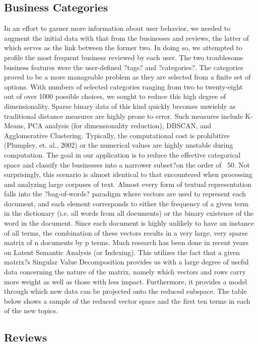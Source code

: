 \subsection{Business Categories}
    \quad In an effort to garner more information about user behavior, we needed to augment the initial data with that from the businesses and reviews, the latter of which serves as the link between the former two. In doing so, we attempted to profile the most frequent business reviewed by each user. The two troublesome business features were the user-defined ?tags? and ?categories?. The categories proved to be a more manageable problem as they are selected from a finite set of options. With numbers of selected categories ranging from two to twenty-eight out of over 1000 possible choices, we sought to reduce this high degree of dimensionality.
    \quad Sparse binary data of this kind quickly becomes unwieldy as traditional distance measures are highly prone to error. Such measures include K-Means, PCA analysis (for dimensionality reduction), DBSCAN, and Agglomerative Clustering. Typically, the computational cost is prohibitive (Plumpley, et. al., 2002) or the numerical values are highly unstable during computation. The goal in our application is to reduce the effective categorical space and classify the businesses into a narrower subset?on the order of ~50. Not surprisingly, this scenario is almost identical to that encountered when processing and analyzing large corpuses of text. Almost every form of textual representation falls into the ?bag-of-words? paradigm where vectors are used to represent each document, and each element corresponds to either the frequency of a given term in the dictionary (i.e. all words from all documents) or the binary existence of the word in the document. Since each document is highly unlikely to have an instance of all terms, the combination of these vectors results in a very large, very sparse matrix of n documents by p terms.
    \quad Much research has been done in recent years on Latent Semantic Analysis (or Indexing). This utilizes the fact that a given matrix?s Singular Value Decomposition provides us with a large degree of useful data concerning the nature of the matrix, namely which vectors and rows carry more weight as well as those with less impact. Furthermore, it provides a model through which new data can be projected onto the reduced subspace. The table below shows a sample of the reduced vector space and the first ten terms in each of the new topics.

\subsection{Reviews}

